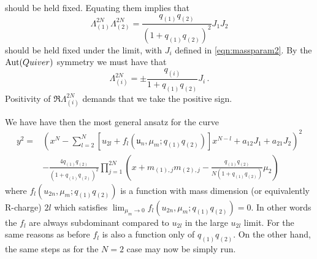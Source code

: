 \documentclass[main.tex]{subfiles}
\begin{document}
should be held fixed. Equating them implies that
\begin{equation}
\Lambda^{2N}_{(1)}\Lambda^{2N}_{(2)}=\frac{q_{(1)}q_{(2)}}{(1+q_{(1)}q_{(2)})^2}J_1J_2
\end{equation}
should be held fixed under the limit, with $J_i$ defined in \eqref{eqn:massparam2}.
By the $\operatorname{Aut}(Quiver)$ symmetry we must have that
\begin{equation}
\Lambda^{2N}_{(i)}=\pm \frac{q_{(i)}}{1+q_{(1)}q_{(2)}}J_i\,.
\end{equation}
Positivity of $\Re\Lambda^{2N}_{(i)}$ demands that we take the positive sign.

We have have then the most general ansatz for the curve
\begin{equation}\label{eqn:gencurveN}
\begin{aligned}
y^2=&\left(x^N-\sum_{l=2}^N\left[u_{2l}+f_l\left(\mathfrak{u}_n,\mu_{m};q_{(1)}q_{(2)}\right)\right]x^{N-l}+a_{12}J_1+a_{21}J_2\right)^2\\
&-\frac{4q_{(1)}q_{(2)}}{(1+q_{(1)}q_{(2)})^2}\prod_{j=1}^{2N}\left(x+m_{(1),j}m_{(2),j}-\frac{q_{(1)}q_{(2)}}{N(1+q_{(1)}q_{(2)})}\mu_2\right)
\end{aligned}
\end{equation}
where $f_l\left(u_{2n},\mu_{m};q_{(1)}q_{(2)}\right)$ is a function with mass dimension (or equivalently R-charge) $2l$ which satisfies $\lim_{\mu_m\to0}f_l\left(u_{2n},\mu_{m};q_{(1)}q_{(2)}\right)=0$. In other words the $f_{l}$ are always subdominant compared to $u_{2l}$ in the large $u_{2l}$ limit. For the same reasons as before $f_l$ is also a function only of $q_{(1)}q_{(2)}$. On the other hand, the same steps as for the $N=2$ case may now be simply run. 
\end{document}
